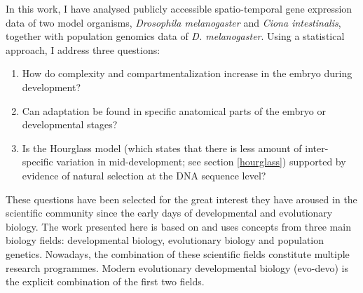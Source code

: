 
In this work, I have analysed publicly accessible spatio-temporal gene expression data of two model organisms, \textit{Drosophila melanogaster} and \textit{Ciona intestinalis}, together with population genomics data of \textit{D. melanogaster}.
Using a statistical approach, I address three questions:
\begin{enumerate}
\item How do complexity and compartmentalization increase in the embryo during development?
\item Can adaptation be found in specific anatomical parts of the embryo or developmental stages? 
\item Is the Hourglass model (which states that there is less amount of inter-specific variation in mid-development; see section \ref{hourglass}) supported by evidence of natural selection at the DNA sequence level?
\end{enumerate}

These questions have been selected for the great interest they have aroused in the scientific community since the early days of developmental and evolutionary biology.
%
The work presented here is based on and uses concepts from three main biology fields: 
developmental biology, evolutionary biology and population genetics.
Nowadays, the combination of these scientific fields constitute multiple research programmes. Modern evolutionary developmental biology (evo-devo) is the explicit combination of the first two fields.
